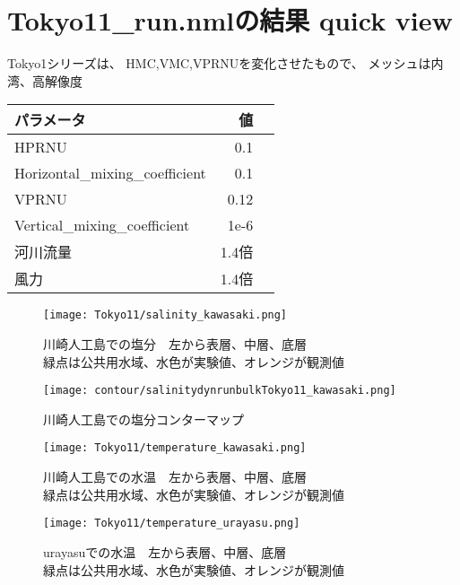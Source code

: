 \documentclass[fontsize=12pt,paper=a4]{jlreq}
\begin{document}
\section{Tokyo11\_run.nmlの結果 quick view}
Tokyo1シリーズは、 HMC,VMC,VPRNUを変化させたもので、
メッシュは内湾、高解像度
\begin{table}
  \begin{minipage}[hbtp]{0.5\hsize}
    \begin{tabular}{lrr} \toprule
      パラメータ & 値 \\ \midrule
      HPRNU & 0.1\\
      Horizontal\_mixing\_coefficient & 0.1\\
      VPRNU & 0.12\\
      Vertical\_mixing\_coefficient & 1e-6\\
      河川流量 & 1.4倍 \\
      風力 & 1.4倍\\ \bottomrule
    \end{tabular}
  \end{minipage}
\end{table}

\begin{figure}[hbtp]
        \centering
        \texttt{[image: Tokyo11/salinity\_kawasaki.png]}
        \caption{川崎人工島での塩分　左から表層、中層、底層\\緑点は公共用水域、水色が実験値、オレンジが観測値}
\end{figure}

\begin{figure}[hbtp]
        \centering
        \texttt{[image: contour/salinitydynrunbulkTokyo11\_kawasaki.png]}
        \caption{川崎人工島での塩分コンターマップ}
\end{figure}


\begin{figure}[hbtp]
        \centering
        \texttt{[image: Tokyo11/temperature\_kawasaki.png]}
        \caption{川崎人工島での水温　左から表層、中層、底層\\緑点は公共用水域、水色が実験値、オレンジが観測値}
\end{figure}
\begin{figure}[hbtp]
  \centering
  \texttt{[image: Tokyo11/temperature\_urayasu.png]}
  \caption{urayasuでの水温　左から表層、中層、底層\\緑点は公共用水域、水色が実験値、オレンジが観測値}
\end{figure}
\end{document}
